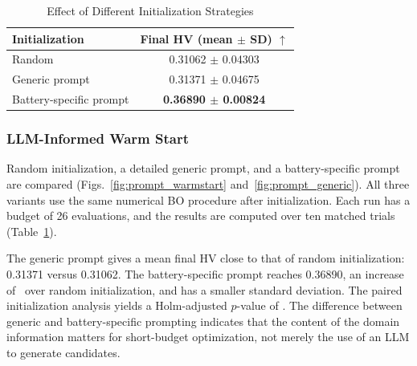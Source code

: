 \begin{table}[!t]
\caption{Effect of Different Initialization Strategies}
\label{tab:prompt_study}
\centering
\footnotesize
\setlength{\tabcolsep}{4.0pt}
\begin{tabular}{@{}lc@{}}
\toprule
Initialization & Final HV (mean $\pm$ SD) $\uparrow$ \\
\midrule
Random & 0.31062 $\pm$ 0.04303 \\
Generic prompt & 0.31371 $\pm$ 0.04675 \\
Battery-specific prompt & \textbf{0.36890 $\pm$ 0.00824} \\
\bottomrule
\end{tabular}
\end{table}

\subsubsection{LLM-Informed Warm Start}

Random initialization, a detailed generic prompt, and a
battery-specific prompt are compared (Figs.~\ref{fig:prompt_warmstart}
and~\ref{fig:prompt_generic}). All three variants use the same numerical BO
procedure after initialization. Each run has a budget of 26 evaluations,
and the results are computed over ten matched trials
(Table~\ref{tab:prompt_study}).

The generic prompt gives a mean final HV close to that of random
initialization: 0.31371 versus 0.31062. The battery-specific prompt reaches
0.36890, an increase of \PromptHVGain\ over random initialization, and has a
smaller standard deviation. The paired initialization analysis yields a
Holm-adjusted $p$-value of \PromptHolmP. The difference between generic and
battery-specific prompting indicates that the content of the domain
information matters for short-budget optimization, not merely the use of an
LLM to generate candidates.

